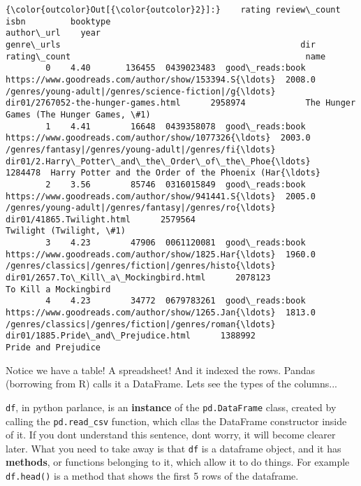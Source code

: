 \documentclass[11pt]{article}
\begin{document}
\begin{Verbatim}[commandchars=\\\{\}]
{\color{outcolor}Out[{\color{outcolor}2}]:}    rating review\_count        isbn         booktype                                         author\_url    year                                         genre\_urls                                                dir rating\_count                                               name
        0    4.40       136455  0439023483  good\_reads:book  https://www.goodreads.com/author/show/153394.S{\ldots}  2008.0  /genres/young-adult|/genres/science-fiction|/g{\ldots}                dir01/2767052-the-hunger-games.html      2958974            The Hunger Games (The Hunger Games, \#1)
        1    4.41        16648  0439358078  good\_reads:book  https://www.goodreads.com/author/show/1077326{\ldots}  2003.0  /genres/fantasy|/genres/young-adult|/genres/fi{\ldots}  dir01/2.Harry\_Potter\_and\_the\_Order\_of\_the\_Phoe{\ldots}      1284478  Harry Potter and the Order of the Phoenix (Har{\ldots}
        2    3.56        85746  0316015849  good\_reads:book  https://www.goodreads.com/author/show/941441.S{\ldots}  2005.0  /genres/young-adult|/genres/fantasy|/genres/ro{\ldots}                          dir01/41865.Twilight.html      2579564                            Twilight (Twilight, \#1)
        3    4.23        47906  0061120081  good\_reads:book  https://www.goodreads.com/author/show/1825.Har{\ldots}  1960.0  /genres/classics|/genres/fiction|/genres/histo{\ldots}              dir01/2657.To\_Kill\_a\_Mockingbird.html      2078123                              To Kill a Mockingbird
        4    4.23        34772  0679783261  good\_reads:book  https://www.goodreads.com/author/show/1265.Jan{\ldots}  1813.0  /genres/classics|/genres/fiction|/genres/roman{\ldots}                dir01/1885.Pride\_and\_Prejudice.html      1388992                                Pride and Prejudice
\end{Verbatim}
            
    Notice we have a table! A spreadsheet! And it indexed the rows. Pandas
(borrowing from R) calls it a DataFrame. Lets see the types of the
columns...

\texttt{df}, in python parlance, is an \textbf{instance} of the
\texttt{pd.DataFrame} class, created by calling the
\texttt{pd.read\_csv} function, which cllas the DataFrame constructor
inside of it. If you dont understand this sentence, dont worry, it will
become clearer later. What you need to take away is that \texttt{df} is
a dataframe object, and it has \textbf{methods}, or functions belonging
to it, which allow it to do things. For example \texttt{df.head()} is a
method that shows the first 5 rows of the dataframe.
\end{document}
